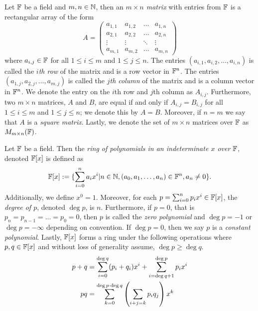 \begin{definition}
	Let $\mathbb{F}$ be a field and $m,n\in\mathbb{N}$, then an \textit{$m\times n$ matrix} with entries from $\mathbb{F}$ is a rectangular array of the form
	\[
		A=
		\begin{pmatrix}
			a_{1,1} & a_{1,2} & \ldots & a_{1,n}\\
			a_{2,1} & a_{2,2} & \ldots & a_{2,n}\\
			\vdots & \vdots & \ddots & \vdots\\
			a_{m,1} & a_{m,2} & \ldots & a_{m,n}
		\end{pmatrix}
	\]
	where $a_{i,j}\in\mathbb{F}$ for all $1\leq i \leq m$ and $1\leq j \leq n$.
	The entries $(a_{i,1},a_{i,2},\ldots,a_{i,n})$ is called the \textit{$i$th row} of the matrix and is a row vector in $\mathbb{F}^n$.
	The entries $(a_{1,j},a_{2,j},\ldots,a_{m,j})$ is called the \textit{$j$th column} of the matrix and is a column vector in $\mathbb{F}^n$.
	We denote the entry on the $i$th row and $j$th column as $A_{i,j}$.
	Furthermore, two $m\times n$ matrices, $A$ and $B$, are equal if and only if $A_{i,j}=B_{i,j}$ for all $1\leq i\leq m$ and $1\leq j\leq n$; we denote this by $A=B$.
	Moreover, if $n=m$ we say that $A$ is a \textit{square matrix}.
	Lastly, we denote the set of $m\times n$ matrices over $\mathbb{F}$ as $M_{m\times n}(\mathbb{F})$.
\end{definition}

\begin{definition}
	Let $\mathbb{F}$ be a field.
	Then the \textit{ring of polynomials in an indeterminate $x$ over $\mathbb{F}$}, denoted $\mathbb{F}[x]$ is defined as
	\[
		\mathbb{F}[x] := \lbrace \sum_{i=0}^n a_i x^i | n\in\mathbb{N}, (a_0,a_1,\ldots,a_n)\in\mathbb{F}^n, a_n\neq 0 \rbrace.
	\]
	Additionally, we define $x^0=1$.
	Moreover, for each $p=\sum_{i=0}^n p_ix^i\in\mathbb{F}[x]$, the \textit{degree of $p$}, denoted $\deg p$, is $n$.
	Furthermore, if $p=0$, that is $p_n=p_{n-1}=\ldots=p_0=0$, then $p$ is called the \textit{zero polynomial} and $\deg p = -1$ or $\deg p =-\infty$ depending on convention.
	If $\deg p=0$, then we say $p$ is a \textit{constant polynomial}.
	Lastly, $\mathbb{F}[x]$ forms a ring under the following operations where $p,q\in\mathbb{F}[x]$ and without loss of generality assume, $\deg p \geq\deg q$.
	\begin{align*}
		p+q &=\sum_{i=0}^{\deg q} (p_i+q_i)x^i +\sum_{i=\deg q + 1}^{\deg p} p_ix^i\\
		p q &= \sum_{k=0}^{\deg p \cdot \deg q} \left( \sum_{i+j=k} p_iq_j \right) x^k
	\end{align*}
\end{definition}

